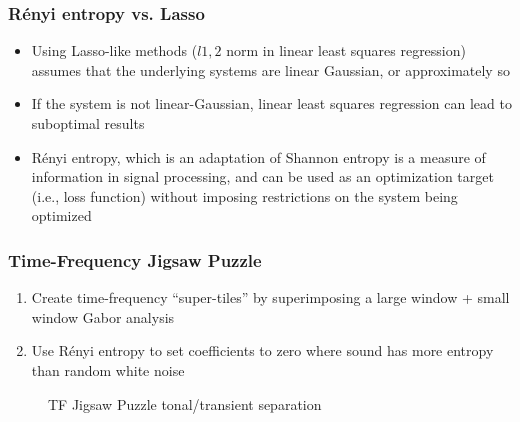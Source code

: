 \documentclass{beamer}
\begin{document}
\begin{frame}
	\frametitle{R{\'e}nyi entropy vs. Lasso}
	\begin{itemize}
	\item
		Using Lasso-like methods ($l1,2$ norm in linear least squares regression) assumes that the underlying systems are linear Gaussian, or approximately so
	\item
		If the system is not linear-Gaussian, linear least squares regression can lead to suboptimal results
	\item
		R{\'e}nyi entropy, which is an adaptation of Shannon entropy  is a measure of information in signal processing, and can be used as an optimization target (i.e., loss function) without imposing restrictions on the system being optimized
	\end{itemize}
\end{frame}

\begin{frame}
	\frametitle{Time-Frequency Jigsaw Puzzle}
	\begin{enumerate}
		\item
			Create time-frequency ``super-tiles'' by superimposing a large window + small window Gabor analysis
		\item
			Use R{\'e}nyi entropy to set coefficients to zero where sound has more entropy than random white noise
	\end{enumerate}
	\begin{figure}[ht]
		\vspace{-0.75em}
		\hspace{0.1em}
		\caption{TF Jigsaw Puzzle tonal/transient separation}
	\end{figure}
\end{frame}
\end{document}
